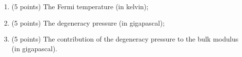 \documentclass[fleqn]{article}
\begin{document}
\begin{enumerate}
\begin{enumerate}
      \item (5 points) The Fermi temperature (in kelvin);

      \item (5 points) The degeneracy pressure (in gigapascal);

      \item (5 points) The contribution of the degeneracy pressure to the bulk modulus (in gigapascal).

    \end{enumerate}

  \end{enumerate}
\end{document}
